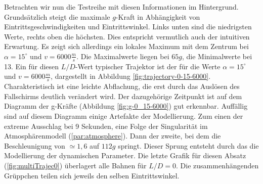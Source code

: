 Betrachten wir nun die Testreihe mit diesen Informationen im Hintergrund. Grundsätzlich steigt die maximale $g$-Kraft in Abhängigkeit von Eintrittsgeschwindigkeiten und Eintrittswinkel. Links unten sind die niedrigsten Werte, rechts oben die höchsten. Dies entspricht vermutlich auch der intuitiven Erwartung. Es zeigt sich allerdings ein lokales Maximum mit dem Zentrum bei $\alpha = 15^{\circ}$ und $v = 6000\frac{m}{s}$. Die Maximalwerte liegen bei $65g$, die Minimalwerte bei 13. Ein für diesen $L/D$-Wert typischer Trajektor ist der für die Werte $\alpha = 15^{\circ}$ und $v = 6000 \frac{m}{s}$, dargestellt in Abbildung \ref{fig:trajectory-0-15-6000}.
Charakteristisch ist eine leichte Abflachung, die erst durch das Auslösen des Fallschirms deutlich verändert wird. Der dazugehörige Zeitpunkt ist auf dem Diagramm der g-Kräfte (Abbildung \ref{fig:g-0_15-6000}) gut erkennbar. Auffällig sind auf diesem Diagramm einige Artefakte der Modellierung. Zum einen der extreme Ausschlag bei 9 Sekunden, eine Folge der Singularität im Atmosphärenmodell (\ref{par:atmosphere}). Dann der zweite, bei dem die Beschleunigung von $\simeq1,6$ auf $112g$ springt. Dieser Sprung entsteht durch das die Modellierung der dynamischen Parameter.
Die letzte Grafik für diesen Absatz (\ref{fig:multiTrajec0}) überlagert alle Bahnen für $L/D = 0$. Die zusammenhängenden Grüppchen teilen sich jeweils den selben Eintrittswinkel.
